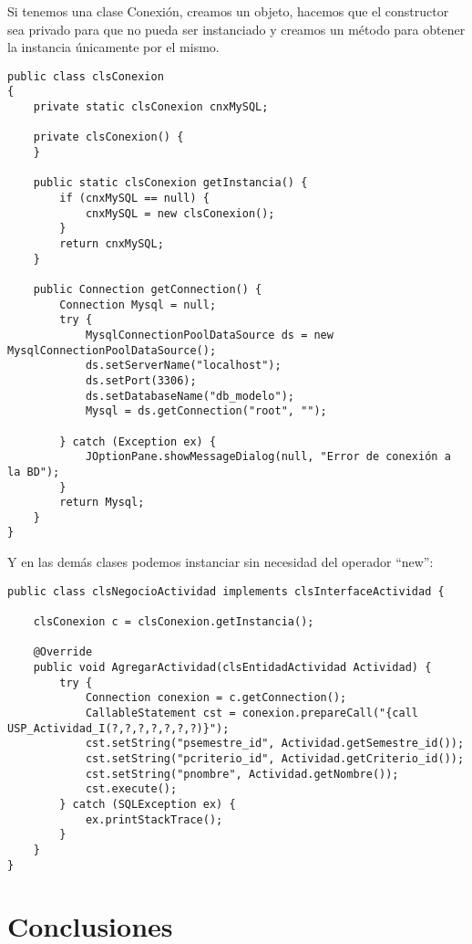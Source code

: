 \documentclass[twoside,twocolumn]{article}
\begin{document}
Si tenemos una clase Conexión, creamos un objeto, hacemos que el constructor sea privado para que no pueda ser instanciado y creamos un método para obtener la instancia únicamente por el mismo.
\lstset{breaklines=true,style=sharpc}
\begin{lstlisting}
public class clsConexion
{
    private static clsConexion cnxMySQL;

    private clsConexion() {
    }    

    public static clsConexion getInstancia() {
        if (cnxMySQL == null) {
            cnxMySQL = new clsConexion();
        }
        return cnxMySQL;
    }

    public Connection getConnection() {
        Connection Mysql = null;
        try {
            MysqlConnectionPoolDataSource ds = new MysqlConnectionPoolDataSource();
            ds.setServerName("localhost");
            ds.setPort(3306);
            ds.setDatabaseName("db_modelo");
            Mysql = ds.getConnection("root", "");

        } catch (Exception ex) {
            JOptionPane.showMessageDialog(null, "Error de conexión a la BD");
        }
        return Mysql;
    }
}
\end{lstlisting}


Y en las demás clases podemos instanciar sin necesidad del operador “new”:
\lstset{breaklines=true,style=sharpc}
\begin{lstlisting}
public class clsNegocioActividad implements clsInterfaceActividad {

    clsConexion c = clsConexion.getInstancia();

    @Override
    public void AgregarActividad(clsEntidadActividad Actividad) {
        try {
            Connection conexion = c.getConnection();
            CallableStatement cst = conexion.prepareCall("{call USP_Actividad_I(?,?,?,?,?,?,?)}");
            cst.setString("psemestre_id", Actividad.getSemestre_id());
            cst.setString("pcriterio_id", Actividad.getCriterio_id());
            cst.setString("pnombre", Actividad.getNombre());
            cst.execute();
        } catch (SQLException ex) {
            ex.printStackTrace();
        }
    }
}
\end{lstlisting}




\section{Conclusiones}
\end{document}
